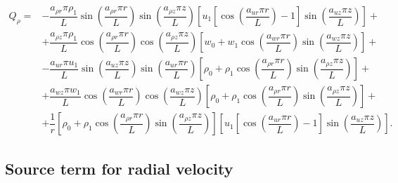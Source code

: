 \documentclass[a4paper,10pt]{article}
\begin{document}
\begin{landscape}
\begin{equation}
 \begin{split}
 \displaystyle
Q_\rho =
&-\dfrac{a_{\rho r} \pi \rho_1}{L}\sin\left(\dfrac{a_{\rho r} \pi r}{L}\right) \sin\left(\dfrac{a_{\rho z} \pi z}{L}\right) \left[u_1 \left[\cos\left(\dfrac{a_{ur} \pi r}{L}\right)-1\right] \sin\left(\dfrac{a_{uz} \pi z}{L}\right) \right]  +\\
&+\dfrac{a_{\rho z} \pi \rho_1}{L}\cos\left(\dfrac{a_{\rho r} \pi r}{L}\right) \cos\left(\dfrac{a_{\rho z} \pi z}{L}\right) \left[w_0 + w_1 \cos\left(\dfrac{a_{wr} \pi r}{L}\right) \sin\left(\dfrac{a_{wz} \pi z}{L}\right) \right]  +\\
&-\dfrac{a_{ur} \pi u_1}{L}\sin\left(\dfrac{a_{uz} \pi z}{L}\right) \sin\left(\dfrac{a_{ur} \pi r}{L}\right) \left[\rho_0 + \rho_1 \cos\left(\dfrac{a_{\rho r} \pi r}{L}\right) \sin\left(\dfrac{a_{\rho z} \pi z}{L}\right) \right]  +\\
&+\dfrac{a_{wz} \pi w_1}{L} \cos\left(\dfrac{a_{wr} \pi r}{L}\right) \cos\left(\dfrac{a_{wz} \pi z}{L}\right) \left[\rho_0 + \rho_1 \cos\left(\dfrac{a_{\rho r} \pi r}{L}\right) \sin\left(\dfrac{a_{\rho z} \pi z}{L}\right) \right] +\\
&+\dfrac{1}{r} \left[\rho_0 + \rho_1 \cos\left(\dfrac{a_{\rho r} \pi r}{L}\right) \sin\left(\dfrac{a_{\rho z} \pi z}{L}\right) \right] \left[u_1 \left[\cos\left(\dfrac{a_{ur} \pi r}{L}\right)-1\right] \sin\left(\dfrac{a_{uz} \pi z}{L}\right) \right].
\end{split}
\end{equation}
%
\subsection{Source term for radial velocity}


\end{landscape}
\end{document}
